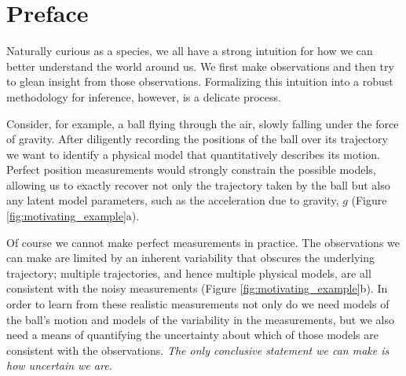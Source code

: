 \chapter*{Preface}

Naturally curious as a species, we all have a strong intuition
for how we can better understand the world around us.  We
first make observations and then try to glean insight from
those observations.  Formalizing this intuition into a robust
methodology for inference, however, is a delicate process.

Consider, for example, a ball flying through the air, slowly
falling under the force of gravity.  After diligently recording the
positions of the ball over its trajectory we want to identify a
physical model that quantitatively describes its motion.  Perfect
position measurements would strongly constrain the possible
models, allowing us to exactly recover not only the trajectory
taken by the ball but also any latent model parameters, such as
the acceleration due to gravity, $g$ (Figure \ref{fig:motivating_example}a).

Of course we cannot make perfect measurements in practice.
The observations we can make are limited by an inherent variability
that obscures the underlying trajectory; multiple trajectories, and
hence multiple physical models, are all consistent with the noisy
measurements (Figure \ref{fig:motivating_example}b).  In order
to learn from these realistic measurements not only do we need
models of the ball's motion and models of the variability in the
measurements, but we also need a means of quantifying the uncertainty
about which of those models are consistent with the observations.
\emph{The only conclusive statement we can make is how uncertain
we are.}

